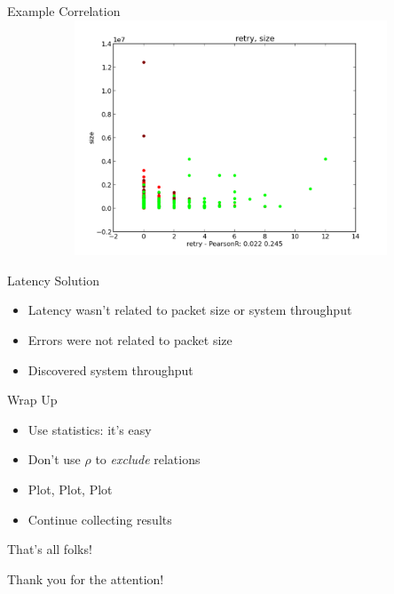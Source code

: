\documentclass{beamer}[10]
\begin{document}
\begin{pyframe}{Example Correlation}
\includegraphics[height=7cm,width=15cm]{retry_size_colored.pdf}
\end{pyframe}


\begin{pyframe}{Latency Solution}
\begin{itemize}
\item Latency wasn't related to packet size or system throughput
\item Errors were not related to packet size
\item Discovered system throughput 
\end{itemize}
\end{pyframe}


\begin{pyframe}{Wrap Up}
\begin{itemize}
\item Use statistics: it's easy
\item Don't use $\rho$ to \emph{exclude} relations
\item Plot, Plot, Plot
\item Continue collecting results
\end{itemize}
\end{pyframe}

\begin{pyframe}{That's all folks!}
\begin{center}
Thank you for the attention! \\\\
\insertauthor
\end{center}
\end{pyframe}
\end{document}
